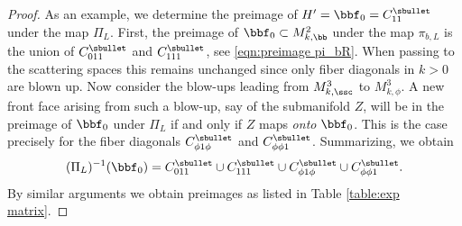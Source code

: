 \begin{proof}
As an example, we determine the preimage of $H'=\bbf_0 = C_{11}^\sbullet$ under the map $\Pi_L$. First, the preimage of $\bbf_0\subset M^2_{k,\bb}$ under the map $\pi_{b,L}$ is the union of $C_{011}^\sbullet$ and $C_{111}^\sbullet$, see \eqref{eqn:preimage pi_bR}.
When passing to the scattering spaces this remains unchanged since only fiber diagonals in $k>0$ are blown up.
Now consider the blow-ups leading from $M^3_{k,\ssc}$ to $M^3_{k,\phi}$.
A new front face arising from such a blow-up, say of the submanifold $Z$, will be in the preimage of $\bbf_0$ under $\Pi_L$ if and only if $Z$ maps \textit{onto} $\bbf_0$. This is the case precisely for the fiber diagonals $C_{\phi1\phi}^\sbullet$ and $C_{\phi\phi1}^\sbullet$. Summarizing, we obtain
\[
(\Pi_L)^{-1}(\bbf_0) = C_{011}^\sbullet \cup C_{111}^\sbullet \cup C_{\phi1\phi}^\sbullet \cup C_{\phi\phi1}^\sbullet.
\]
By similar arguments we obtain preimages as listed in Table \ref{table:exp matrix}.


\end{proof}
